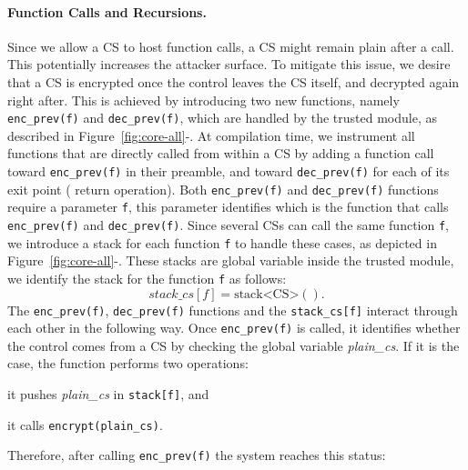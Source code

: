 \paragraph{Function Calls and Recursions.}
Since we allow a CS to host function calls, a CS might remain plain after a 
call. This potentially increases the attacker surface.
To mitigate this issue, we desire that a CS is encrypted once the control 
leaves the CS itself, and decrypted again right after.
This is achieved by introducing two new functions, namely \texttt{enc\_prev(f)} 
and \texttt{dec\_prev(f)}, which are handled by the trusted module, as 
described in Figure~\ref{fig:core-all}-.
At compilation time, we instrument all functions that are directly called from 
within a CS by adding a function call toward \texttt{enc\_prev(f)} in their 
preamble, and toward \texttt{dec\_prev(f)} for each of its exit point (\ie 
return operation).
Both \texttt{enc\_prev(f)} and \texttt{dec\_prev(f)} functions require a 
parameter \texttt{f}, this parameter identifies which is the function that 
calls \texttt{enc\_prev(f)} and \texttt{dec\_prev(f)}.
Since several CSs can call the same function \texttt{f}, we introduce a stack 
for each function \texttt{f} to handle these cases, as depicted in 
Figure~\ref{fig:core-all}-.
These stacks are global variable inside the trusted module, we identify the 
stack for the function \texttt{f} as follows:
$$
stack\_cs[f] = \text{stack<CS>}().
$$
The \texttt{enc\_prev(f)}, \texttt{dec\_prev(f)} functions and the 
\texttt{stack\_cs[f]} interact through each other in the following way.
Once \texttt{enc\_prev(f)} is called, it identifies whether the control comes 
from a CS by checking the global variable \emph{plain\_cs}.
If it is the case, the function performs two operations: 
\begin{enumerate*}[label=(\roman*)]
	\item it pushes \emph{plain\_cs} in \texttt{stack[f]}, and
	\item it calls \texttt{encrypt(plain\_cs)}.
\end{enumerate*}
Therefore, after calling \texttt{enc\_prev(f)} the system reaches this status:

